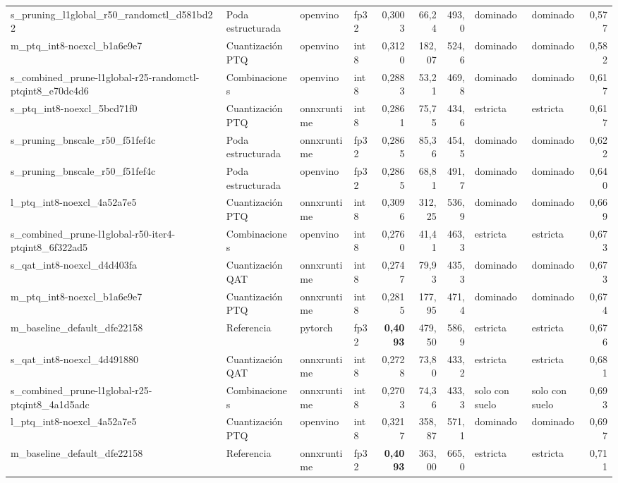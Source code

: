 \begin{landscape}
\begin{table}[htbp]
\begin{adjustbox}{max width=\linewidth, max totalheight=\dimexpr\textheight-\ht\tfmedgetitle-\dp\tfmedgetitle-\ht\tfmedgenotes-\dp\tfmedgenotes-6pt\relax}
\begin{tabular}{llllrrrllr}
    s\_pruning\_l1global\_r50\_randomctl\_d581bd22 & Poda estructurada & openvino & fp32 & 0,3003 & 66,24 & 493,0 & dominado & dominado & 0,577 \\
    m\_ptq\_int8-noexcl\_b1a6e9e7 & Cuantización PTQ & openvino & int8 & 0,3120 & 182,07 & 524,6 & dominado & dominado & 0,582 \\
    s\_combined\_prune-l1global-r25-randomctl-ptqint8\_e70dc4d6 & Combinaciones & openvino & int8 & 0,2883 & 53,21 & 469,8 & dominado & dominado & 0,617 \\
    s\_ptq\_int8-noexcl\_5bcd71f0 & Cuantización PTQ & onnxruntime & int8 & 0,2861 & 75,75 & 434,6 & estricta & estricta & 0,617 \\
    s\_pruning\_bnscale\_r50\_f51fef4c & Poda estructurada & onnxruntime & fp32 & 0,2865 & 85,36 & 454,5 & dominado & dominado & 0,622 \\
    s\_pruning\_bnscale\_r50\_f51fef4c & Poda estructurada & openvino & fp32 & 0,2865 & 68,81 & 491,7 & dominado & dominado & 0,640 \\
    l\_ptq\_int8-noexcl\_4a52a7e5 & Cuantización PTQ & onnxruntime & int8 & 0,3096 & 312,25 & 536,9 & dominado & dominado & 0,669 \\
    s\_combined\_prune-l1global-r50-iter4-ptqint8\_6f322ad5 & Combinaciones & openvino & int8 & 0,2760 & 41,41 & 463,3 & estricta & estricta & 0,673 \\
    s\_qat\_int8-noexcl\_d4d403fa & Cuantización QAT & onnxruntime & int8 & 0,2747 & 79,93 & 435,3 & dominado & dominado & 0,673 \\
    m\_ptq\_int8-noexcl\_b1a6e9e7 & Cuantización PTQ & onnxruntime & int8 & 0,2815 & 177,95 & 471,4 & dominado & dominado & 0,674 \\
    m\_baseline\_default\_dfe22158 & Referencia & pytorch & fp32 & \textbf{0,4093} & 479,50 & 586,9 & estricta & estricta & 0,676 \\
    s\_qat\_int8-noexcl\_4d491880 & Cuantización QAT & onnxruntime & int8 & 0,2728 & 73,80 & 433,2 & estricta & estricta & 0,681 \\
    s\_combined\_prune-l1global-r25-ptqint8\_4a1d5adc & Combinaciones & onnxruntime & int8 & 0,2703 & 74,36 & 433,3 & solo con suelo & solo con suelo & 0,693 \\
    l\_ptq\_int8-noexcl\_4a52a7e5 & Cuantización PTQ & openvino & int8 & 0,3217 & 358,87 & 571,1 & dominado & dominado & 0,697 \\
    m\_baseline\_default\_dfe22158 & Referencia & onnxruntime & fp32 & \textbf{0,4093} & 363,00 & 665,0 & estricta & estricta & 0,711 \\

\end{tabular}
\end{adjustbox}
\end{table}
\end{landscape}
